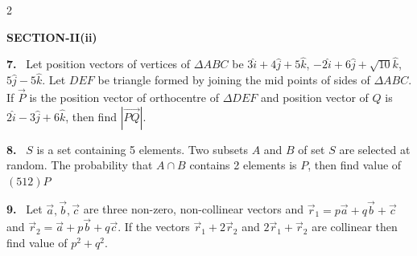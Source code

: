 \documentclass[10pt]{extarticle}
\newcommand{\sect}[1]{\par\smallskip\noindent\textbf{#1}\par}
\newcommand{\qn}[1]{\par\smallskip\noindent\textbf{#1.}~}
\begin{document}
\begin{multicols}{2}
\sect{SECTION-II(ii)}
\qn{7} Let position vectors of vertices of $\Delta ABC$ be $3\hat i+4\hat j+5\hat k$, $-2\hat i+6\hat j+\sqrt{10}\hat k$, $5\hat j-5\hat k$. Let $DEF$ be triangle formed by joining the mid points of sides of $\Delta ABC$. If $\vec P$ is the position vector of orthocentre of $\Delta DEF$ and position vector of $Q$ is $2\hat i-3\hat j+6\hat k$, then find $\left|\overrightarrow{PQ}\right|$.
\qn{8} $S$ is a set containing 5 elements. Two subsets $A$ and $B$ of set $S$ are selected at random. The probability that $A\cap B$ contains 2 elements is $P$, then find value of $(512)P$
\qn{9} Let $\vec a,\vec b,\vec c$ are three non-zero, non-collinear vectors and $\vec r_1=p\vec a+q\vec b+\vec c$ and $\vec r_2=\vec a+p\vec b+q\vec c$. If the vectors $\vec r_1+2\vec r_2$ and $2\vec r_1+\vec r_2$ are collinear then find value of $p^2+q^2$.

\end{multicols}
\end{document}
